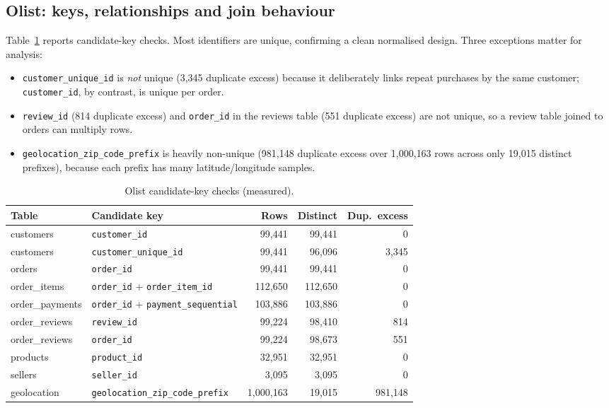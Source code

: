 \documentclass[11pt,a4paper]{article}
\newcommand{\code}[1]{\texttt{#1}}
\begin{document}
\subsection{Olist: keys, relationships and join behaviour}
Table~\ref{tab:olist-keys} reports candidate-key checks. Most identifiers are unique, confirming a clean normalised design. Three exceptions matter for analysis:
\begin{itemize}
\item \code{customer\_unique\_id} is \emph{not} unique (3{,}345 duplicate excess) because it deliberately links repeat purchases by the same customer; \code{customer\_id}, by contrast, is unique per order.
\item \code{review\_id} (814 duplicate excess) and \code{order\_id} in the reviews table (551 duplicate excess) are not unique, so a review table joined to orders can multiply rows.
\item \code{geolocation\_zip\_code\_prefix} is heavily non-unique (981{,}148 duplicate excess over 1{,}000{,}163 rows across only 19{,}015 distinct prefixes), because each prefix has many latitude/longitude samples.
\end{itemize}

\begin{table}[H]
\centering
\small
\caption{Olist candidate-key checks (measured).}
\label{tab:olist-keys}
\begin{tabular}{llrrr}
\toprule
\textbf{Table} & \textbf{Candidate key} & \textbf{Rows} & \textbf{Distinct} & \textbf{Dup.\ excess} \\
\midrule
customers & \code{customer\_id} & 99{,}441 & 99{,}441 & 0 \\
customers & \code{customer\_unique\_id} & 99{,}441 & 96{,}096 & 3{,}345 \\
orders & \code{order\_id} & 99{,}441 & 99{,}441 & 0 \\
order\_items & \code{order\_id} + \code{order\_item\_id} & 112{,}650 & 112{,}650 & 0 \\
order\_payments & \code{order\_id} + \code{payment\_sequential} & 103{,}886 & 103{,}886 & 0 \\
order\_reviews & \code{review\_id} & 99{,}224 & 98{,}410 & 814 \\
order\_reviews & \code{order\_id} & 99{,}224 & 98{,}673 & 551 \\
products & \code{product\_id} & 32{,}951 & 32{,}951 & 0 \\
sellers & \code{seller\_id} & 3{,}095 & 3{,}095 & 0 \\
geolocation & \code{geolocation\_zip\_code\_prefix} & 1{,}000{,}163 & 19{,}015 & 981{,}148 \\
\bottomrule
\end{tabular}
\end{table}
\end{document}
